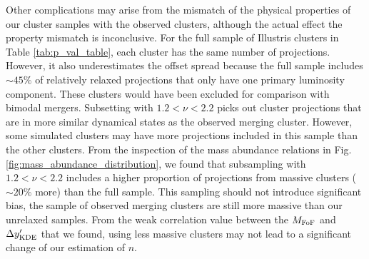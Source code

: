 
Other complications may arise from the mismatch of the physical properties of 
our cluster samples with the observed clusters, although the actual effect the
property mismatch is inconclusive. 
For the full sample of Illustris clusters in Table \ref{tab:p_val_table}, 
each cluster has the same number of projections. 
However, it also underestimates the offset spread because the
full sample includes $\sim 45\%$ of relatively relaxed projections 
that only have one primary luminosity component.  These clusters would
have been excluded for comparison with bimodal mergers. 
Subsetting with $1.2 < \nu < 2.2$ picks out
cluster projections that are in more similar dynamical states as the observed merging
cluster. 
However, some simulated clusters may have more projections included in this sample
than the other clusters. From the inspection of the mass abundance relations in 
Fig. \ref{fig:mass_abundance_distribution}, we found that subsampling with $1.2 <
\nu <2.2$ includes a higher proportion of projections from massive clusters
($\sim 20\%$ more) than 
the full sample. 
This sampling should not introduce significant bias, 
the sample of observed merging clusters are still more massive than our
unrelaxed samples. From the weak correlation value between the $M_{\rm FoF}$ and
$\Delta y_{\rm KDE}'$ that we found, using less massive clusters may not lead to a significant
change of our estimation of $n$.  

